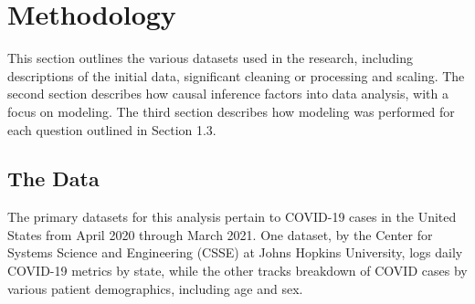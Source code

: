 \documentclass[11pt]{article}
\begin{document}
\section{Methodology}


This section outlines the various datasets used in the research, including descriptions of the initial data, significant cleaning or processing and scaling. The second section describes how causal inference factors into data analysis, with a focus on modeling. The third section describes how modeling was performed for each question outlined in Section 1.3.


\subsection{The Data}

The primary datasets for this analysis pertain to COVID-19 cases in the United States from April 2020 through March 2021.  One dataset, by the Center for Systems Science and Engineering (CSSE) at Johns Hopkins University, logs daily COVID-19 metrics by state, while the other tracks breakdown of COVID cases by various patient demographics, including age and sex. 
\end{document}
